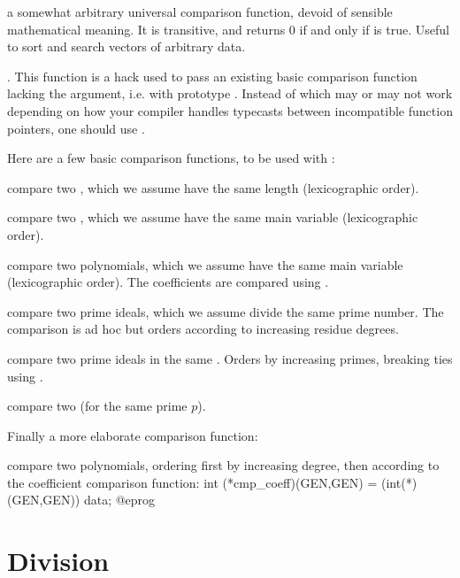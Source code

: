 
 a somewhat arbitrary universal
comparison function, devoid of sensible mathematical meaning. It is
transitive, and returns 0 if and only if  is true.
Useful to sort and search vectors of arbitrary data.

. This function is a hack
used to pass an existing basic comparison function lacking the 
argument, i.e. with prototype . Instead of
 which may or may not work depending on how your
compiler handles typecasts between incompatible function pointers, one should
use .

Here are a few basic comparison functions, to be used with :

 compare two , which we assume have
the same length (lexicographic order).

 compare two , which we assume
have the same main variable (lexicographic order).

 compare two polynomials, which we assume
have the same main variable (lexicographic order). The coefficients are
compared using .

 compare two prime ideals, which
we assume divide the same prime number. The comparison is ad hoc but orders
according to increasing residue degrees.

 compare two prime ideals in the same
. Orders by increasing primes, breaking ties using
.

 compare two  (for the same
prime $p$).

Finally a more elaborate comparison function:

 compare two polynomials,
ordering first by increasing degree, then according to the coefficient
comparison function:
\bprog
  int (*cmp_coeff)(GEN,GEN) = (int(*)(GEN,GEN)) data;
@eprog

\section{Division}

